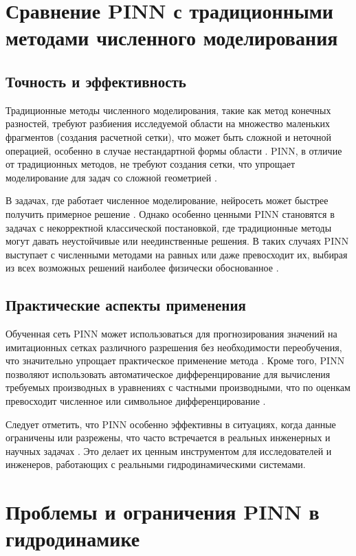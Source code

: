\section{Сравнение PINN с традиционными методами численного моделирования}
\subsection{Точность и эффективность}
Традиционные методы численного моделирования, такие как метод конечных разностей, требуют разбиения исследуемой области
на множество маленьких фрагментов (создания расчетной сетки), что может быть сложной и неточной операцией, особенно в
случае нестандартной формы области \cite{ferziger2019computational}. PINN, в отличие от традиционных методов, не требуют
создания сетки, что упрощает моделирование для задач со сложной геометрией \cite{karniadakis2021physics}.

В задачах, где работает численное моделирование, нейросеть может быстрее получить примерное
решение \cite{kochkov2021machine}. Однако особенно ценными PINN становятся в задачах с некорректной классической постановкой,
где традиционные методы могут давать неустойчивые или неединственные решения. В таких случаях PINN выступает с численными
методами на равных или даже превосходит их, выбирая из всех возможных решений наиболее физически
обоснованное \cite{yang2019adversarial}.

\subsection{Практические аспекты применения}
Обученная сеть PINN может использоваться для прогнозирования значений на имитационных сетках различного разрешения без
необходимости переобучения, что значительно упрощает практическое применение метода \cite{raissi2019physics}. Кроме того,
PINN позволяют использовать автоматическое дифференцирование для вычисления требуемых производных в уравнениях с частными
производными, что по оценкам превосходит численное или символьное дифференцирование \cite{baydin2018automatic}.

Следует отметить, что PINN особенно эффективны в ситуациях, когда данные ограничены или разрежены, что часто встречается
в реальных инженерных и научных задачах \cite{zhu2019physics}. Это делает их ценным инструментом для исследователей и
инженеров, работающих с реальными гидродинамическими системами.

\section{Проблемы и ограничения PINN в гидродинамике}
